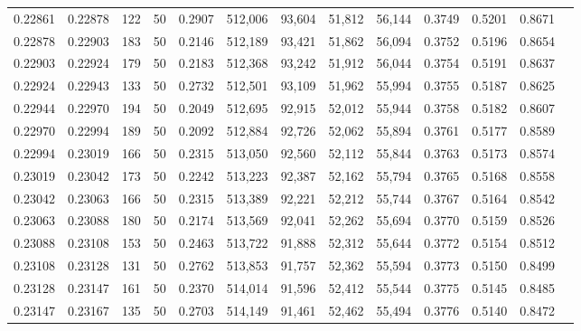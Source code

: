 \begin{tabular}{rrrrrrrrrrrrr}
0.22861 & 0.22878 &   122 &  50 &                                     0.2907 & 512,006 &  93,604 &  51,812 &  56,144 & 0.3749 & 0.5201 & 0.8671 \\
0.22878 & 0.22903 &   183 &  50 &                                     0.2146 & 512,189 &  93,421 &  51,862 &  56,094 & 0.3752 & 0.5196 & 0.8654 \\
0.22903 & 0.22924 &   179 &  50 &                                     0.2183 & 512,368 &  93,242 &  51,912 &  56,044 & 0.3754 & 0.5191 & 0.8637 \\
0.22924 & 0.22943 &   133 &  50 &                                     0.2732 & 512,501 &  93,109 &  51,962 &  55,994 & 0.3755 & 0.5187 & 0.8625 \\
0.22944 & 0.22970 &   194 &  50 &                                     0.2049 & 512,695 &  92,915 &  52,012 &  55,944 & 0.3758 & 0.5182 & 0.8607 \\
0.22970 & 0.22994 &   189 &  50 &                                     0.2092 & 512,884 &  92,726 &  52,062 &  55,894 & 0.3761 & 0.5177 & 0.8589 \\
0.22994 & 0.23019 &   166 &  50 &                                     0.2315 & 513,050 &  92,560 &  52,112 &  55,844 & 0.3763 & 0.5173 & 0.8574 \\
0.23019 & 0.23042 &   173 &  50 &                                     0.2242 & 513,223 &  92,387 &  52,162 &  55,794 & 0.3765 & 0.5168 & 0.8558 \\
0.23042 & 0.23063 &   166 &  50 &                                     0.2315 & 513,389 &  92,221 &  52,212 &  55,744 & 0.3767 & 0.5164 & 0.8542 \\
0.23063 & 0.23088 &   180 &  50 &                                     0.2174 & 513,569 &  92,041 &  52,262 &  55,694 & 0.3770 & 0.5159 & 0.8526 \\
0.23088 & 0.23108 &   153 &  50 &                                     0.2463 & 513,722 &  91,888 &  52,312 &  55,644 & 0.3772 & 0.5154 & 0.8512 \\
0.23108 & 0.23128 &   131 &  50 &                                     0.2762 & 513,853 &  91,757 &  52,362 &  55,594 & 0.3773 & 0.5150 & 0.8499 \\
0.23128 & 0.23147 &   161 &  50 &                                     0.2370 & 514,014 &  91,596 &  52,412 &  55,544 & 0.3775 & 0.5145 & 0.8485 \\
0.23147 & 0.23167 &   135 &  50 &                                     0.2703 & 514,149 &  91,461 &  52,462 &  55,494 & 0.3776 & 0.5140 & 0.8472 \\

\end{tabular}
